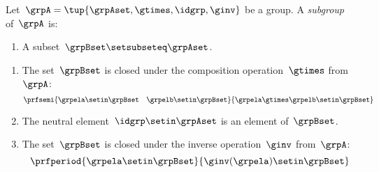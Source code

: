 \begin{definition}[Subgroup]\label{def:subgroup}
    Let~$\grpA = \tup{\grpAset, \gtimes, \idgrp, \ginv}$ be a group.
    A \emph{subgroup} of~$\grpA$ is:

    \constit

    \begin{enumerate}
        \item A subset~$\grpBset \setsubseteq \grpAset$.
    \end{enumerate}

    \condit

    \begin{enumerate}
        \item The set~$\grpBset$ is closed under the composition operation~$\gtimes$ from~$\grpA$:
              \begin{equation}
                  \prfsemi{\grpela \setin \grpBset \quad \grpelb \setin \grpBset}{\grpela \gtimes \grpelb \setin \grpBset}
              \end{equation}

        \item The neutral element~$\idgrp \setin \grpAset$ is an element of~$\grpBset$.

        \item The set~$\grpBset$ is closed under the inverse operation~$\ginv$ from~$\grpA$:
              \begin{equation}
                  \prfperiod{\grpela \setin \grpBset}{\ginv(\grpela) \setin \grpBset}
              \end{equation}
    \end{enumerate}
\end{definition}
